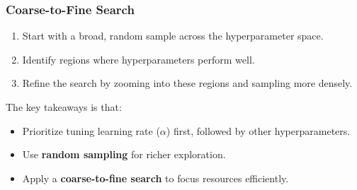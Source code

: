 \documentclass[letterpaper,12pt,notitlepage,twoside]{report}
\begin{document}
\subsubsection*{Coarse-to-Fine Search}
\begin{enumerate}[noitemsep, topsep=0pt]
    \item Start with a broad, random sample across the hyperparameter space.
    \item Identify regions where hyperparameters perform well.
    \item Refine the search by zooming into these regions and sampling more densely.
\end{enumerate}

The key takeaways is that:
\begin{itemize}[noitemsep, topsep=0pt]
    \item Prioritize tuning learning rate ($\alpha$) first, followed by other hyperparameters.
    \item Use \textbf{random sampling} for richer exploration.
    \item Apply a \textbf{coarse-to-fine search} to focus resources efficiently.
\end{itemize}

\newpage
\end{document}
